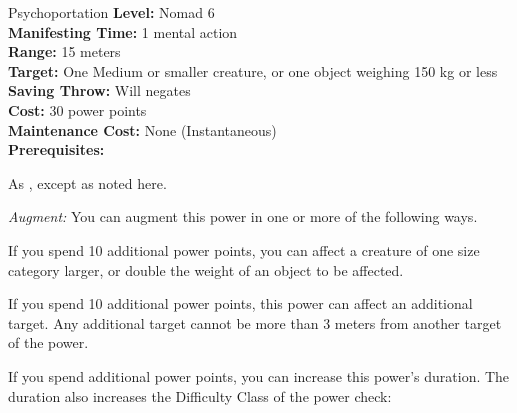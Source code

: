 {Psychoportation}
{
	\textbf{Level:}
	Nomad 6\\
	\textbf{Manifesting Time:}
	1 mental action\\
	\textbf{Range:}
	15 meters\\
	\textbf{Target:}
	One Medium or smaller creature, or one object weighing 150 kg or less\\
	\textbf{Saving Throw:}
	Will negates\\
	\textbf{Cost:}
	30 power points\\
	\textbf{Maintenance Cost:}
	None (Instantaneous)\\
	\textbf{Prerequisites:}
	\\
}
{
	As , except as noted here.

	\textit{Augment:} You can augment this power in one or more of the following ways.
	\begin{enumerate*}
	\item If you spend 10 additional power points, you can affect a creature of one size category larger, or double the weight of an object to be affected.
	\item If you spend 10 additional power points, this power can affect an additional target. Any additional target cannot be more than 3 meters from another target of the power.
	\item If you spend additional power points, you can increase this power's duration. The duration also increases the Difficulty Class of the power check:
	\end{enumerate*}

}
